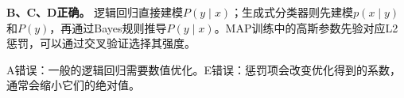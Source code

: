 \textbf{B、C、D正确。} 逻辑回归直接建模\(P(y\mid x)\)；生成式分类器则先建模\(p(x\mid y)\)和\(P(y)\)，再通过Bayes规则推导\(P(y\mid x)\)。MAP训练中的高斯参数先验对应L2惩罚，可以通过交叉验证选择其强度。


A错误：一般的逻辑回归需要数值优化。E错误：惩罚项会改变优化得到的系数，通常会缩小它们的绝对值。
